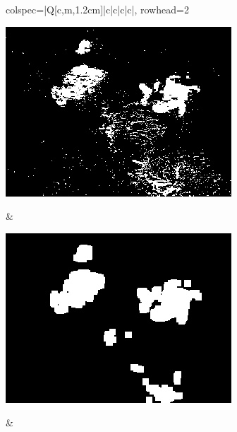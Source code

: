 \begin{longtblr}[
            caption = {Hasil uji coba proses \textit{background subtraction} menggunakan GMM yang disempurnakan oleh Operasi Morfologi},
            label = {tab:gmm_morph_9908}
        ]{
            colspec={|Q[c,m,1.2cm]|c|c|c|c|},
            rowhead=2
        }
\begin{minipage}{0.19\textwidth}
                \includegraphics[width=\linewidth]{image/gt_116/gt_116_gmm_frame1167.jpg}
            \end{minipage} & 
            \begin{minipage}{0.19\textwidth}
                \includegraphics[width=\linewidth]{image/gt_116/gt_116_dilated_3x9_frame1167.jpg}
            \end{minipage} &
            \begin{minipage}{0.19\textwidth}

\end{minipage}
\end{longtblr}
